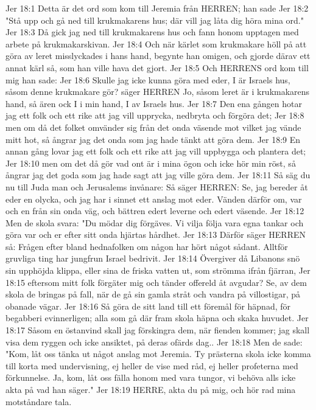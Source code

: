 Jer 18:1  Detta är det ord som kom till Jeremia från HERREN; han sade
Jer 18:2  "Stå upp och gå ned till krukmakarens hus; där vill jag låta dig höra mina ord."
Jer 18:3  Då gick jag ned till krukmakarens hus och fann honom upptagen med arbete på krukmakarskivan.
Jer 18:4  Och när kärlet som krukmakare höll på att göra av leret misslyckades i hans hand, begynte han omigen, och gjorde därav ett annat kärl så, som han ville hava det gjort.
Jer 18:5  Och HERRENS ord kom till mig han sade:
Jer 18:6  Skulle jag icke kunna göra med eder, I är Israels hus, såsom denne krukmakare gör? säger HERREN Jo, såsom leret är i krukmakarens hand, så ären ock I i min hand, I av Israels hus.
Jer 18:7  Den ena gången hotar jag ett folk och ett rike att jag vill upprycka, nedbryta och förgöra det;
Jer 18:8  men om då det folket omvänder sig från det onda väsende mot vilket jag vände mitt hot, så ångrar jag det onda som jag hade tänkt att göra dem.
Jer 18:9  En annan gång lovar jag ett folk och ett rike att jag vill uppbygga och plantera det;
Jer 18:10  men om det då gör vad ont är i mina ögon och icke hör min röst, så ångrar jag det goda som jag hade sagt att jag ville göra dem.
Jer 18:11  Så säg du nu till Juda man och Jerusalems invånare: Så säger HERREN: Se, jag bereder åt eder en olycka, och jag har i sinnet ett anslag mot eder. Vänden därför om, var och en från sin onda väg, och bättren edert leverne och edert väsende.
Jer 18:12  Men de skola svara: "Du mödar dig förgäves. Vi vilja följa vara egna tankar och göra var och er efter sitt onda hjärtas hårdhet.
Jer 18:13  Därför säger HERREN så: Frågen efter bland hednafolken om någon har hört något sådant. Alltför gruvliga ting har jungfrun Israel bedrivit.
Jer 18:14  Övergiver då Libanons snö sin upphöjda klippa, eller sina de friska vatten ut, som strömma ifrån fjärran,
Jer 18:15  eftersom mitt folk förgäter mig och tänder offereld åt avgudar? Se, av dem skola de bringas på fall, när de gå sin gamla stråt och vandra på villostigar, på obanade vägar.
Jer 18:16  Så göra de sitt land till ett föremål för häpnad, för begabberi evinnerligen; alla som gå där fram skola häpna och skaka huvudet.
Jer 18:17  Såsom en östanvind skall jag förskingra dem, när fienden kommer; jag skall visa dem ryggen och icke ansiktet, på deras ofärds dag..
Jer 18:18  Men de sade: "Kom, låt oss tänka ut något anslag mot Jeremia. Ty prästerna skola icke komma till korta med undervisning, ej heller de vise med råd, ej heller profeterna med förkunnelse. Ja, kom, låt oss fälla honom med vara tungor, vi behöva alls icke akta på vad han säger."
Jer 18:19  HERRE, akta du på mig, och hör rad mina motståndare tala.
